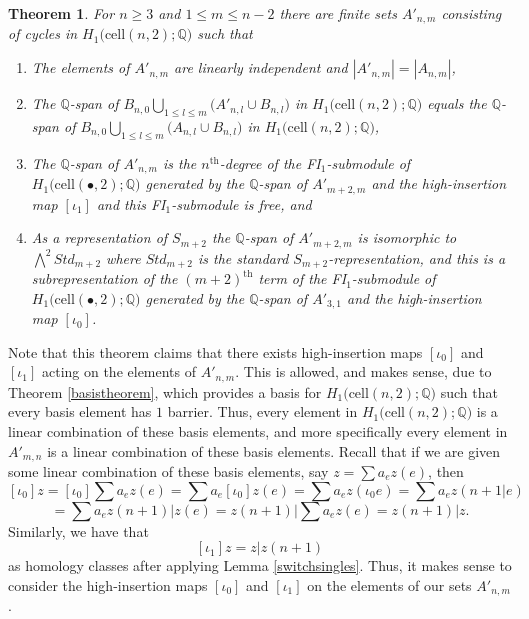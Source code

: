 \documentclass[12py]{amsart}%
\newtheorem{thm}{Theorem}[section]
\theoremstyle{definition}\newtheorem{definition}[thm]{Definition}
\theoremstyle{definition}
\newcommand{\Q}{\ensuremath{\mathbb{Q}}}
\begin{document}
\begin{thm}\label{betterbasisforH1}
For $n\ge 3$ and $1\le m\le n-2$ there are finite sets $A'_{n,m}$ consisting of cycles in $H_{1}\big(\text{cell}(n,2);\Q\big)$ such that 
\begin{enumerate}
\item The elements of $A'_{n,m}$ are linearly independent and $|A'_{n,m}|=|A_{n,m}|$,
\item The $\Q$-span of $B_{n,0}\bigcup_{1\le l\le m}\big(A'_{n,l}\cup B_{n,l}\big)$ in $H_{1}\big(\text{cell}(n,2);\Q\big)$ equals the $\Q$-span of $B_{n,0}\bigcup_{1\le l\le m}\big(A_{n,l}\cup B_{n,l}\big)$ in $H_{1}\big(\text{cell}(n,2);\Q\big)$,
\item The $\Q$-span of $A'_{n,m}$ is the $n^{\text{th}}$-degree of the FI$_{1}$-submodule of $H_{1}\big(\text{cell}(\bullet, 2);\Q\big)$ generated by the $\Q$-span of $A'_{m+2,m}$ and the high-insertion map $[\iota_{1}]$ and this FI$_{1}$-submodule is free, and
\item As a representation of $S_{m+2}$ the $\Q$-span of $A'_{m+2, m}$ is isomorphic to $\bigwedge^{2}Std_{m+2}$ where $Std_{m+2}$ is the standard $S_{m+2}$-representation, and this is a subrepresentation of the $(m+2)^{\text{th}}$ term of the FI$_{1}$-submodule of $H_{1}\big(\text{cell}(\bullet, 2);\Q\big)$ generated by the $\Q$-span of $A'_{3,1}$ and the high-insertion map $[\iota_{0}]$.
\end{enumerate}
\end{thm}

Note that this theorem claims that there exists high-insertion maps $[\iota_{0}]$ and $[\iota_{1}]$ acting on the elements of $A'_{n,m}$.  This is allowed, and makes sense, due to Theorem \ref{basistheorem}, which provides a basis for $H_{1}\big(\text{cell}(n,2);\Q\big)$ such that every basis element has $1$ barrier. Thus, every element in $H_{1}\big(\text{cell}(n,2);\Q\big)$ is a linear combination of these basis elements, and more specifically every element in $A'_{m,n}$ is a linear combination of these basis elements. Recall that if we are given some linear combination of these basis elements, say $z=\sum a_{e}z(e)$, then 
\[
[\iota_{0}]z=[\iota_{0}]\sum a_{e}z(e)=\sum a_{e}[\iota_{0}]z(e)=\sum a_{e}z(\iota_{0}e)=\sum a_{e}z(n+1|e)
\]
\[
=\sum a_{e}z(n+1)|z(e)=z(n+1)|\sum a_{e}z(e)=z(n+1)|z.
\]
Similarly, we have that 
\[
[\iota_{1}]z=z|z(n+1)
\]
as homology classes after applying Lemma \ref{switchsingles}. Thus, it makes sense to consider the high-insertion maps $[\iota_{0}]$ and $[\iota_{1}]$ on the elements of our sets $A'_{n,m}$.
\end{document}

